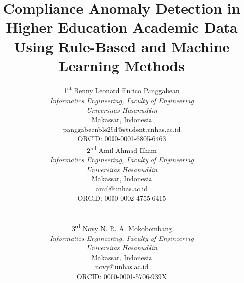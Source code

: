 \documentclass[conference]{IEEEtran}
\newif\ifblind
\begin{document}
\title{Compliance Anomaly Detection in Higher Education Academic Data Using Rule-Based and Machine Learning Methods}

\ifblind
\author{\IEEEauthorblockN{Anonymous Authors}
\IEEEauthorblockA{\textit{Anonymous Institution}\\
Anonymous City, Country}}
\else
\author{\parbox{\textwidth}{\centering
\parbox[t]{0.45\textwidth}{\centering
{\normalsize 1\textsuperscript{st} Benny Leonard Enrico Panggabean}\\
{\small \textit{Informatics Engineering, Faculty of Engineering} \\
\textit{Universitas Hasanuddin}\\
Makassar, Indonesia \\
panggabeanble25d@student.unhas.ac.id \\
ORCID: 0000-0001-6805-6463}}\hfill
\parbox[t]{0.45\textwidth}{\centering
{\normalsize 2\textsuperscript{nd} Amil Ahmad Ilham}\\
{\small \textit{Informatics Engineering, Faculty of Engineering} \\
\textit{Universitas Hasanuddin}\\
Makassar, Indonesia \\
amil@unhas.ac.id \\
ORCID: 0000-0002-4755-6415}}\\[2ex]
\parbox[t]{0.45\textwidth}{\centering
{\normalsize 3\textsuperscript{rd} Novy N. R. A. Mokobombang}\\
{\small \textit{Informatics Engineering, Faculty of Engineering} \\
\textit{Universitas Hasanuddin}\\
Makassar, Indonesia \\
novy@unhas.ac.id \\
ORCID: 0000-0001-5706-939X}}
}}
\fi

\maketitle
\end{document}
